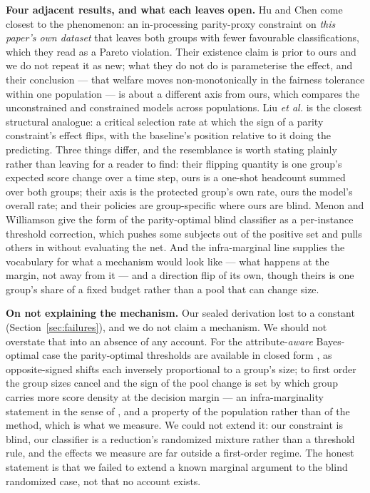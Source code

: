\documentclass[9pt,conference]{IEEEtran}
\begin{document}
\textbf{Four adjacent results, and what each leaves open.} Hu and Chen \cite{hu2020} come
closest to the phenomenon: an in-processing parity-proxy constraint on \emph{this paper's own
dataset} that leaves both groups with fewer favourable classifications, which they read as a
Pareto violation. Their existence claim is prior to ours and we do not repeat it as new; what
they do not do is parameterise the effect, and their conclusion --- that welfare moves
non-monotonically in the fairness tolerance within one population --- is about a different
axis from ours, which compares the unconstrained and constrained models across populations.
Liu \emph{et al.} \cite{liu2018} is the closest structural analogue: a critical selection rate
at which the sign of a parity constraint's effect flips, with the baseline's position relative
to it doing the predicting. Three things differ, and the resemblance is worth stating plainly
rather than leaving for a reader to find: their flipping quantity is one group's expected
score change over a time step, ours is a one-shot headcount summed over both groups; their
axis is the protected group's own rate, ours the model's overall rate; and their policies are
group-specific where ours are blind. Menon and Williamson \cite{menon2018} give the form of
the parity-optimal blind classifier as a per-instance threshold correction, which pushes some
subjects out of the positive set and pulls others in without evaluating the net. And the
infra-marginal line \cite{corbett2017,corbett2023} supplies the vocabulary for what a mechanism
would look like --- what happens at the margin, not away from it --- and a direction flip of
its own, though theirs is one group's share of a fixed budget rather than a pool that can
change size.

\textbf{On not explaining the mechanism.} Our sealed derivation lost to a constant
(Section~\ref{sec:failures}), and we do not claim a mechanism. We should not overstate that
into an absence of any account. For the attribute-\emph{aware} Bayes-optimal case the
parity-optimal thresholds are available in closed form \cite{zeng2022}, as opposite-signed
shifts each inversely proportional to a group's size; to first order the group sizes cancel
and the sign of the pool change is set by which group carries more score density at the
decision margin --- an infra-marginality statement in the sense of \cite{corbett2023}, and a
property of the population rather than of the method, which is what we measure. We could not
extend it: our constraint is blind, our classifier is a reduction's randomized mixture rather
than a threshold rule, and the effects we measure are far outside a first-order regime. The
honest statement is that we failed to extend a known marginal argument to the blind
randomized case, not that no account exists.
\end{document}
